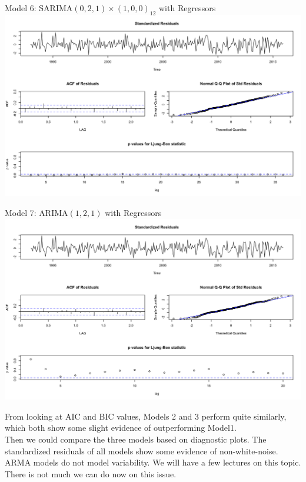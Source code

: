   \begin{frame}{Model 6: SARIMA\((0,2,1) \times (1,0,0)_{12}\) with Regressors}
  		\includegraphics[width=\linewidth]{images/seasonallyadjustedmodel6}
  \end{frame}
  
  
  \begin{frame}{Model 7: ARIMA\((1,2,1)\) with Regressors}
  		\includegraphics[width=\linewidth]{images/seasonallyadjustedmodel7}
  \end{frame}  
  
  
  From looking at AIC and BIC values, Models 2 and 3 perform quite similarly, which both show some slight evidence of outperforming Model1.\\
  
  Then we could compare the three models based on diagnostic plots. The standardized residuals of all models show some evidence of non-white-noise. ARMA models do not model variability. We will have a few lectures on this topic. There is not much we can do now on this issue.\\
  
